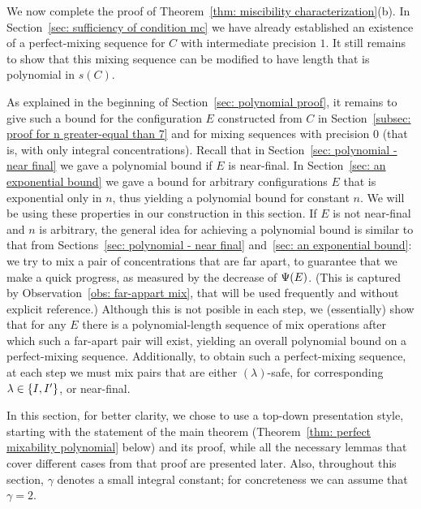 
%

We now complete the proof of Theorem~\ref{thm: miscibility characterization}(b).
In Section~\ref{sec: sufficiency of condition mc} we have already established an existence of a perfect-mixing 
sequence for $C$ with intermediate precision $1$.
It still remains to show that this mixing sequence can be modified to have length that is polynomial in $s(C)$.

As explained in the beginning of Section~\ref{sec: polynomial proof}, it remains to
give such a bound for the configuration $E$ constructed from $C$ in Section~\ref{subsec: proof for n greater-equal than 7}
and for mixing sequences with precision $0$ (that is, with only integral concentrations).
Recall that in Section~\ref{sec: polynomial - near final} we gave a polynomial bound if $E$ is near-final.
In Section~\ref{sec: an exponential bound} we gave a bound for arbitrary configurations $E$ that is
exponential only in $n$, thus yielding a polynomial bound for constant $n$.
We will be using these properties in our construction in this section. 
If $E$ is not near-final and $n$ is arbitrary, the general idea for achieving a polynomial bound
is similar to that from Sections~\ref{sec: polynomial - near final} and~\ref{sec: an exponential bound}:
we try to mix a pair of concentrations that are far apart,
to guarantee that we make a quick progress, as measured by the decrease of ${\Psi}(E)$. 
(This is captured by Observation~\ref{obs: far-appart mix}, that will be used frequently and without
explicit reference.) Although this is not posible in each step, we (essentially)
show that for any $E$ there is a polynomial-length sequence of mix operations after which such a
far-apart pair will exist, yielding an overall polynomial bound on a perfect-mixing sequence.
Additionally, to obtain such a perfect-mixing sequence,
at each step we must mix pairs that are either $(\lambda)$-safe, 
for corresponding $\lambda\in{ \left\{ I,I' \right\} }$, or near-final.

In this section, for better clarity, we chose to use a top-down presentation style, starting with the statement
of the main theorem (Theorem~\ref{thm: perfect mixability polynomial} below) and its proof, while
all the necessary lemmas that cover different cases from that proof are presented later.
Also, throughout this section, $\gamma$ denotes a small integral constant; for
concreteness we can assume that $\gamma = 2$.

